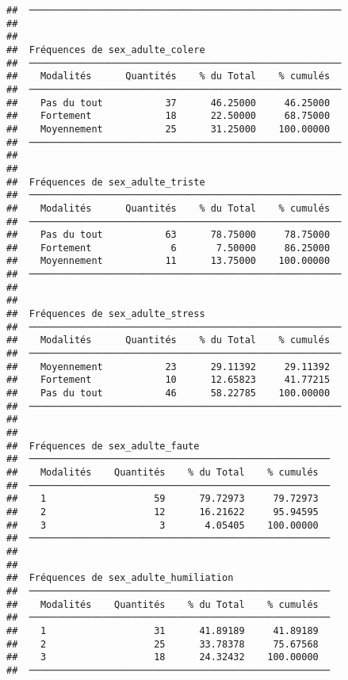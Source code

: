 \documentclass[
]{article}
\begin{document}
\begin{verbatim}
##  ─────────────────────────────────────────────────────── 
## 
## 
##  Fréquences de sex_adulte_colere                         
##  ─────────────────────────────────────────────────────── 
##    Modalités      Quantités    % du Total    % cumulés   
##  ─────────────────────────────────────────────────────── 
##    Pas du tout           37      46.25000     46.25000   
##    Fortement             18      22.50000     68.75000   
##    Moyennement           25      31.25000    100.00000   
##  ─────────────────────────────────────────────────────── 
## 
## 
##  Fréquences de sex_adulte_triste                         
##  ─────────────────────────────────────────────────────── 
##    Modalités      Quantités    % du Total    % cumulés   
##  ─────────────────────────────────────────────────────── 
##    Pas du tout           63      78.75000     78.75000   
##    Fortement              6       7.50000     86.25000   
##    Moyennement           11      13.75000    100.00000   
##  ─────────────────────────────────────────────────────── 
## 
## 
##  Fréquences de sex_adulte_stress                         
##  ─────────────────────────────────────────────────────── 
##    Modalités      Quantités    % du Total    % cumulés   
##  ─────────────────────────────────────────────────────── 
##    Moyennement           23      29.11392     29.11392   
##    Fortement             10      12.65823     41.77215   
##    Pas du tout           46      58.22785    100.00000   
##  ─────────────────────────────────────────────────────── 
## 
## 
##  Fréquences de sex_adulte_faute                        
##  ───────────────────────────────────────────────────── 
##    Modalités    Quantités    % du Total    % cumulés   
##  ───────────────────────────────────────────────────── 
##    1                   59      79.72973     79.72973   
##    2                   12      16.21622     95.94595   
##    3                    3       4.05405    100.00000   
##  ───────────────────────────────────────────────────── 
## 
## 
##  Fréquences de sex_adulte_humiliation                  
##  ───────────────────────────────────────────────────── 
##    Modalités    Quantités    % du Total    % cumulés   
##  ───────────────────────────────────────────────────── 
##    1                   31      41.89189     41.89189   
##    2                   25      33.78378     75.67568   
##    3                   18      24.32432    100.00000   
##  ─────────────────────────────────────────────────────
\end{verbatim}
\end{document}
